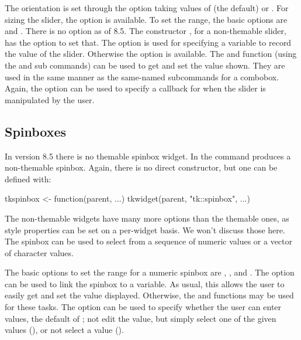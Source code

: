 The orientation is set through the option 
taking values of  (the default) or
. For sizing the slider, the 
option is available.  To set the range, the basic options are
 and . There is no  option as of \TK\/ 8.5. The constructor
, for a non-themable slider, has the option
 to set that. The
 option is used for specifying a \TCL\/
variable to record the value of the slider. Otherwise the
 option is available.  The  and  function (using the 
 and  sub commands)
can be used to get and set the value shown. They are used in the same
manner as the same-named subcommands for a combobox. Again, the
 option can be used to specify a callback
for when the slider is manipulated by the user.


\subsection{Spinboxes}
\label{sec:tcltk:spinboxes}

In \TK\/ version 8.5 there is no themable spinbox widget. In \TK\/ the
 command produces a non-themable spinbox. Again, there
is no direct  constructor, but one can be
defined with:
\begin{Schunk}
\begin{Sinput}
 tkspinbox <- function(parent, ...) 
   tkwidget(parent, "tk::spinbox", ...)
\end{Sinput}
\end{Schunk}

The non-themable widgets have many more options than the themable
ones, as style properties can be set on a per-widget basis. We won't
discuss those here. The spinbox can be used to select from a sequence
of numeric values or a vector of character values.


The basic options to set the range for a numeric spinbox are
, , and
.  The 
option can be used to link the spinbox to a \TCL\/ variable. As usual,
this allows the user to easily get and set the value
displayed. Otherwise, the  and 
functions may be used for these tasks. The option
 can be used to specify whether the user can
enter values, the default of ; not edit the value, but
simply select one of the given values (), or not
select a value ().


